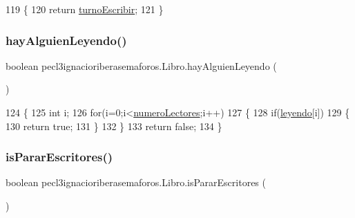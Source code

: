 \begin{DoxyCode}
119     \{
120         \textcolor{keywordflow}{return} \mbox{\hyperlink{classpecl3ignacioriberasemaforos_1_1_libro_a970295d15bdfebb950a6fca5c300562a}{turnoEscribir}};
121     \}
\end{DoxyCode}
\mbox{\label{classpecl3ignacioriberasemaforos_1_1_libro_ac67a7afbfa38fb566526bfa7f688beaa}} 
\subsubsection{\texorpdfstring{hay\+Alguien\+Leyendo()}{hayAlguienLeyendo()}}
{\footnotesize\ttfamily boolean pecl3ignacioriberasemaforos.\+Libro.\+hay\+Alguien\+Leyendo (\begin{DoxyParamCaption}{ }\end{DoxyParamCaption})\hspace{0.3cm}{\ttfamily [inline]}}


\begin{DoxyCode}
124     \{
125         \textcolor{keywordtype}{int} i;
126         \textcolor{keywordflow}{for}(i=0;i<\mbox{\hyperlink{classpecl3ignacioriberasemaforos_1_1_libro_aab14f16eb696d97ce1373e7325b61077}{numeroLectores}};i++)
127         \{
128             \textcolor{keywordflow}{if}(\mbox{\hyperlink{classpecl3ignacioriberasemaforos_1_1_libro_ac3024d92434cf24e0ebf9eca9c91f86a}{leyendo}}[i])
129             \{
130                 \textcolor{keywordflow}{return} \textcolor{keyword}{true};
131             \}
132         \}
133         \textcolor{keywordflow}{return} \textcolor{keyword}{false};
134     \}
\end{DoxyCode}
\mbox{\label{classpecl3ignacioriberasemaforos_1_1_libro_aa68c7f9315d2c2f07ac549f13b1525bc}} 
\subsubsection{\texorpdfstring{is\+Parar\+Escritores()}{isPararEscritores()}}
{\footnotesize\ttfamily boolean pecl3ignacioriberasemaforos.\+Libro.\+is\+Parar\+Escritores (\begin{DoxyParamCaption}{ }\end{DoxyParamCaption})\hspace{0.3cm}{\ttfamily [inline]}}


